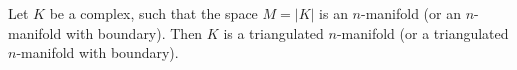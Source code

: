 Let $K$ be a complex, such that the space $M = |K|$ is an $n$-manifold (or an $n$-manifold with boundary). Then $K$ is a triangulated $n$-manifold (or a triangulated $n$-manifold with boundary).
